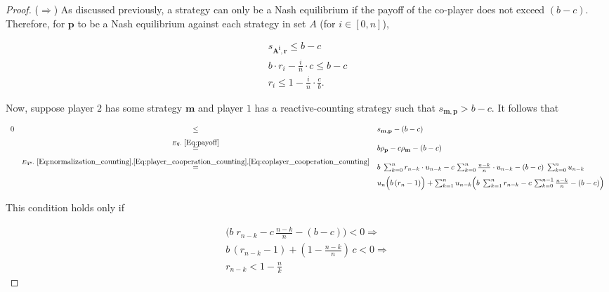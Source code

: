 \documentclass{article}
\theoremstyle{definition}
\begin{document}
\begin{proof}
($\Rightarrow$) As discussed previously, a strategy can only be a Nash equilibrium if the payoff of the co-player does not exceed $(b - c)$. Therefore, for $\mathbf{p}$ to be a Nash equilibrium against each strategy in set $A$ (for $i \in [0, n]$),

\begin{align*}
  s_{\mathbf{A^{i}}, \mathbf{r}} \leq b - c \\
  b \cdot r_i - \frac{i}{n} \cdot c \leq   b - c \\
  r_i \leq 1 - \frac{i}{n} \cdot \frac{c}{b}.
\end{align*}

Now, suppose player $2$ has some strategy $\mathbf{m}$ and player $1$ has a reactive-counting strategy such that $s_{\mathbf{m}, \mathbf{p}} > b - c$. It follows that

\begin{equation}
\begin{array}{rcl}
0 &\le & s_{\mathbf{m}, \mathbf{p}}-(b - c)\\[0.2cm]
&\stackrel{Eq.~\eqref{Eq:payoff}}{=} & b\rho_\mathbf{p} - c\rho_\mathbf{m} - (b - c)\\[0.2cm]
&\stackrel{Eqs.~\eqref{Eq:normalization_counting}, \eqref{Eq:player_cooperation_counting}, \eqref{Eq:coplayer_cooperation_counting}}{=} & b\; \sum_{k=0}^{n} r_{n - k} \cdot u_{n - k} - c\, \sum_{k=0}^{n} \frac{n - k}{n} \cdot u_{n - k} - (b - c)\; \sum_{k=0}^{n} u_{n - k}\\[0.2cm]
& &  u_{n} \Big(b\, (r_n - 1) \Big) +  \sum_{k=1}^{n} u_{n - k} \Big(b\; \sum_{k=1}^{n} r_{n - k} - c\, \sum_{k=0}^{n - 1} \frac{n - k}{n} - (b - c)\Big)
\end{array}
\end{equation}

This condition holds only if

\begin{align*}
  \Big(b\; r_{n - k} - c\, \frac{n - k}{n} - (b - c)\Big) < 0 \Rightarrow \\ 
  b \, (r_{n - k} - 1) + (1 - \frac{n - k}{n})\, c < 0 \Rightarrow \\ 
  r_{n - k} < 1 - \frac{n}{k} 
\end{align*}

\end{proof}

~\\

\end{document}
